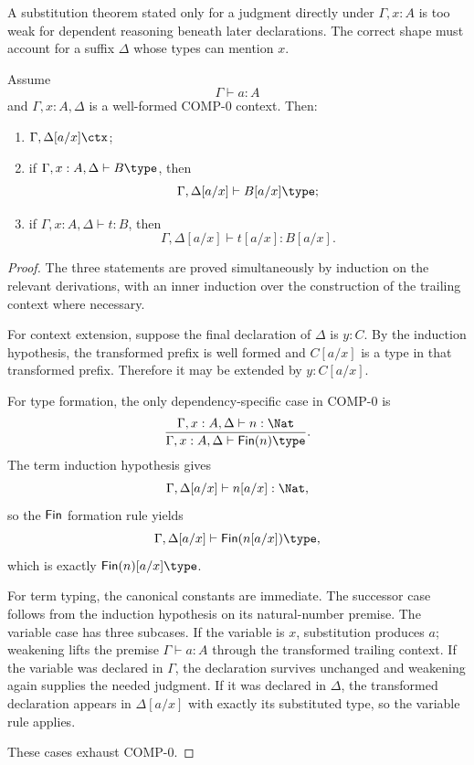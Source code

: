 \documentclass[11pt,openany]{book}
\begin{document}
A substitution theorem stated only for a judgment directly under $\Gamma,x:A$ is too weak for dependent reasoning beneath later declarations. The correct shape must account for a suffix $\Delta$ whose types can mention $x$.

\begin{theorem}
Assume
\[
  \Gamma\vdash a:A
\]
and $\Gamma,x:A,\Delta$ is a well-formed COMP-0 context. Then:

\begin{enumerate}[label=(\roman*)]
\item $\Gamma,\Delta[a/x]\ctx$;
\item if $\Gamma,x:A,\Delta\vdash B\type$, then
\[
  \Gamma,\Delta[a/x]\vdash B[a/x]\type;
\]
\item if $\Gamma,x:A,\Delta\vdash t:B$, then
\[
  \Gamma,\Delta[a/x]\vdash t[a/x]:B[a/x].
\]
\end{enumerate}
\end{theorem}

\begin{proof}
The three statements are proved simultaneously by induction on the relevant derivations, with an inner induction over the construction of the trailing context where necessary.

For context extension, suppose the final declaration of $\Delta$ is $y:C$. By the induction hypothesis, the transformed prefix is well formed and $C[a/x]$ is a type in that transformed prefix. Therefore it may be extended by $y:C[a/x]$.

For type formation, the only dependency-specific case in COMP-0 is
\[
  \frac{\Gamma,x:A,\Delta\vdash n:\Nat}
       {\Gamma,x:A,\Delta\vdash \Fin(n)\type}.
\]
The term induction hypothesis gives
\[
  \Gamma,\Delta[a/x]\vdash n[a/x]:\Nat,
\]
so the $\mathsf{Fin}$ formation rule yields
\[
  \Gamma,\Delta[a/x]\vdash \Fin(n[a/x])\type,
\]
which is exactly $\Fin(n)[a/x]\type$.

For term typing, the canonical constants are immediate. The successor case follows from the induction hypothesis on its natural-number premise. The variable case has three subcases. If the variable is $x$, substitution produces $a$; weakening lifts the premise $\Gamma\vdash a:A$ through the transformed trailing context. If the variable was declared in $\Gamma$, the declaration survives unchanged and weakening again supplies the needed judgment. If it was declared in $\Delta$, the transformed declaration appears in $\Delta[a/x]$ with exactly its substituted type, so the variable rule applies.

These cases exhaust COMP-0.
\end{proof}
\end{document}
